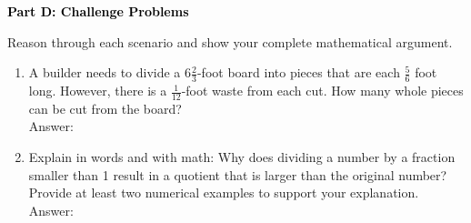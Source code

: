 \documentclass[12pt, letterpaper, fleqn]{article}
\newcommand{\blanklong}{\underline{\hspace{6.5cm}}}
\begin{document}
\begin{tcolorbox}[colback=black!10]
    \large\textcolor{black}{\textbf{Part D: Challenge Problems}}
\end{tcolorbox}

\vspace{3mm}
\noindent
Reason through each scenario and show your complete mathematical argument.

\vspace{5mm}
\begin{enumerate}[itemsep=2.5cm, leftmargin=0.6cm]
\item A builder needs to divide a $6\frac{2}{3}$-foot board into pieces that are each $\frac{5}{6}$ foot long. However, there is a $\frac{1}{12}$-foot waste from each cut. How many whole pieces can be cut from the board? \\
Answer: \blanklong

\item Explain in words and with math: Why does dividing a number by a fraction smaller than 1 result in a quotient that is larger than the original number? Provide at least two numerical examples to support your explanation. \\
Answer: \blanklong
\end{enumerate}
\end{document}
